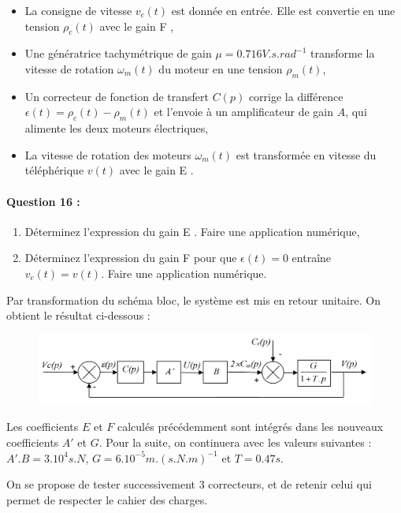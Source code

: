 \begin{itemize}
 \item La consigne de vitesse $v_c(t)$ est donnée en entrée. Elle est convertie en une tension $\rho_c(t)$ avec le gain \og F \fg,
 \item Une génératrice tachymétrique de gain $\mu=0.716 V.s.rad^{-1}$ transforme la vitesse de rotation $\omega_m(t)$ du moteur en une tension $\rho_m(t)$,
 \item Un correcteur de fonction de transfert $C(p)$ corrige la différence $\epsilon(t)=\rho_c(t)-\rho_m(t)$ et l'envoie à un amplificateur de gain $A$, qui alimente les deux moteurs électriques,
 \item La vitesse de rotation des moteurs $\omega_m(t)$ est transformée en vitesse du téléphérique $v(t)$ avec le gain \og E \fg.
\end{itemize}

\paragraph{Question 16 :}

\begin{enumerate}
 \item Déterminez l'expression du gain \og E \fg. Faire une application numérique,
 \item Déterminez l'expression du gain \og F \fg pour que $\epsilon(t)=0$ entraîne $v_c(t)=v(t)$. Faire une application numérique.
\end{enumerate}

Par transformation du schéma bloc, le système est mis en retour unitaire. On obtient le résultat ci-dessous :

\begin{figure}[!h]
\centering
\includegraphics[width=0.8\linewidth]{img/fig29}
\label{fig29}
\end{figure}

Les coefficients $E$ et $F$ calculés précédemment sont intégrés dans les nouveaux coefficients $A'$ et $G$. Pour la suite, on continuera avec les valeurs suivantes : $A'.B=3.10^4s.N$, $G=6.10^{-5}m.(s.N.m)^{-1}$ et $T=0.47s$.

On se propose de tester successivement 3 correcteurs, et de retenir celui qui permet de respecter le cahier des charges.


